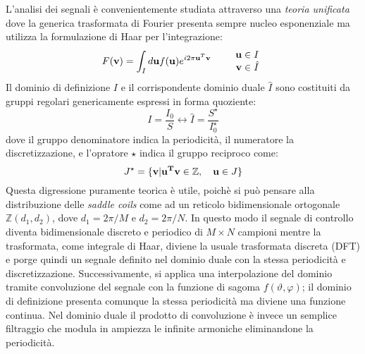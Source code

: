 L'analisi dei segnali è convenientemente studiata attraverso una
\emph{teoria unificata} \cite{cariolaro} dove la generica trasformata
di Fourier presenta sempre nucleo esponenziale ma utilizza la
formulazione di Haar per l'integrazione:
\begin{equation}
 F({\bf v}) = \int_I d{\bf u} f({\bf u})e^{i2\pi{\bf u}^T{\bf v}} \quad \quad
  \begin{array}{r}
   {\bf u} \in I \\
   {\bf v} \in \hat I
  \end{array}
\end{equation}
Il dominio di definizione $I$ e il corrispondente dominio duale $\hat I$
sono costituiti da gruppi regolari genericamente espressi in forma
quoziente: $$ I = \frac{I_0}{S} \longleftrightarrow \hat{I} =
\frac{S^\star}{I_0^\star} $$ dove il gruppo denominatore indica la
periodicità, il numeratore la discretizzazione, e l'opratore $\star$
indica il gruppo reciproco come: $$J^\star = \{{\bf v}| {\bf
u^Tv}\in\mathbb{Z} ,\quad {\bf u}\in J \}$$ Questa digressione puramente
teorica è utile, poichè si può pensare alla distribuzione delle
\emph{saddle coils} come ad un reticolo bidimensionale ortogonale
$\mathbb{Z}(d_1,d_2)$, dove $d_1 = 2\pi/M$ e $d_2 = 2\pi/N$. In questo
modo il segnale di controllo diventa bidimensionale discreto e periodico
di $M\times N$ campioni mentre la trasformata, come integrale di Haar,
diviene la usuale trasformata discreta (DFT) e porge quindi un segnale
definito nel dominio duale con la stessa periodicità e
discretizzazione. Successivamente, si applica una interpolazione del
dominio tramite convoluzione del segnale con la funzione di sagoma
$f(\vartheta,\varphi)$; il dominio di definizione presenta comunque la
stessa periodicità ma diviene una funzione continua. Nel dominio duale
il prodotto di convoluzione è invece un semplice filtraggio che modula
in ampiezza le infinite armoniche eliminandone la periodicità.




